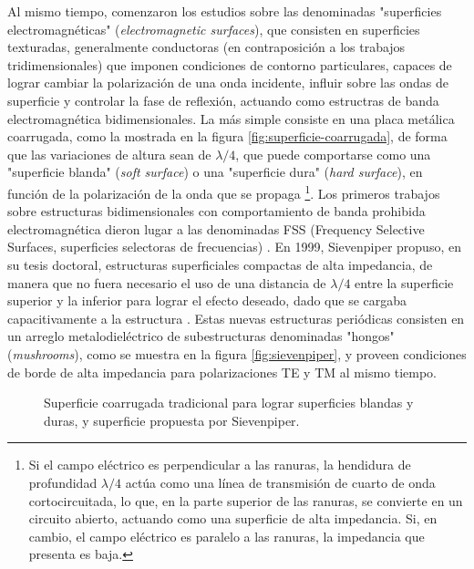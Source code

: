 Al mismo tiempo, comenzaron los estudios sobre las denominadas "superficies electromagnéticas" (\textit{electromagnetic surfaces}), que consisten en superficies texturadas, generalmente conductoras (en contraposición a los trabajos tridimensionales) que imponen condiciones de contorno particulares, capaces de lograr cambiar la polarización de una onda incidente, influir sobre las ondas de superficie y controlar la fase de reflexión, actuando como estructras de banda electromagnética bidimensionales. La más simple consiste en una placa metálica coarrugada, como la mostrada en la figura \ref{fig:superficie-coarrugada}, de forma que las variaciones de altura sean de $\lambda/4$, que puede comportarse como una "superficie blanda" (\textit{soft surface}) o una "superficie dura" (\textit{hard surface}), en función de la polarización de la onda que se propaga \footnote{Si el campo eléctrico es perpendicular a las ranuras, la hendidura de profundidad $\lambda/4$ actúa como una línea de transmisión de cuarto de onda cortocircuitada, lo que, en la parte superior de las ranuras, se convierte en un circuito abierto, actuando como una superficie de alta impedancia. Si, en cambio, el campo eléctrico es paralelo a las ranuras, la impedancia que presenta es baja.}. Los primeros trabajos sobre estructuras bidimensionales con comportamiento de banda prohibida electromagnética dieron lugar a las denominadas FSS (Frequency Selective Surfaces, superficies selectoras de frecuencias) \cite{Munk}. En 1999, Sievenpiper \cite{Sievenpiper:Thesis} propuso, en su tesis doctoral, estructuras superficiales compactas de alta impedancia, de manera que no fuera necesario el uso de una distancia de $\lambda/4$ entre la superficie superior y la inferior para lograr el efecto deseado, dado que se cargaba capacitivamente a la estructura \cite{Marcela:Tesis} \cite{Sievenpiper:HIESForbiddenBand}. Estas nuevas estructuras periódicas consisten en un arreglo metalodieléctrico de subestructuras denominadas "hongos" (\textit{mushrooms}), como se muestra en la figura \ref{fig:sievenpiper}, y proveen condiciones de borde de alta impedancia para polarizaciones TE y TM al mismo tiempo.

\begin{figure}[H]
	\centering 
	\hspace{30pt}
	\caption{Superficie coarrugada tradicional para lograr superficies blandas y duras, y superficie propuesta por Sievenpiper.}
	\label{fig:sievenpiper-comparacion}
\end{figure}

